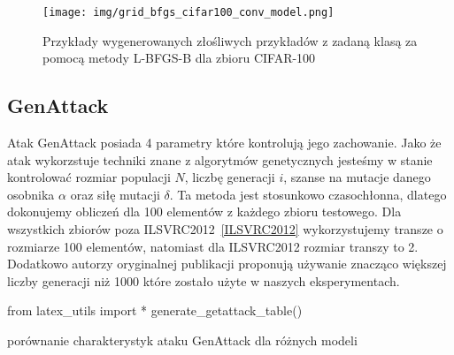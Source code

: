 \documentclass[
    left=2.5cm,         %
    right=2.5cm,        %
    top=2.5cm,          %
    bottom=3cm,         %
    bindingoffset=6mm,  %
    nohyphenation=false %
]{eiti/eiti-thesis}
\begin{document}
\begin{figure}[H]
    \texttt{[image: img/grid\_bfgs\_cifar100\_conv\_model.png]}
    \caption{Przykłady wygenerowanych złośliwych przykładów z zadaną klasą za pomocą metody L-BFGS-B dla zbioru CIFAR-100}
    \label{fig:cifar100_grid_bfgs}
\end{figure}


\subsection{GenAttack}
Atak GenAttack posiada 4 parametry które kontrolują jego zachowanie. Jako że atak wykorzstuje techniki
znane z algorytmów genetycznych jesteśmy w stanie kontrolować rozmiar populacji $N$, liczbę generacji $i$, szanse na mutacje
danego osobnika $\alpha$ oraz siłę mutacji $\delta$.
Ta metoda jest stosunkowo czasochłonna, dlatego dokonujemy obliczeń dla 100 elementów z każdego zbioru testowego.
Dla wszystkich zbiorów poza ILSVRC2012~\ref{ILSVRC2012} wykorzystujemy transze o rozmiarze 100 elementów, natomiast dla ILSVRC2012 rozmiar transzy to 2.
Dodatkowo autorzy oryginalnej publikacji proponują używanie znacząco większej liczby generacji niż 1000 które zostało użyte w naszych eksperymentach.

\begin{table}[h]
\begin{adjustbox}{max width=\textwidth}
\begin{pycode}
from latex_utils import *
generate_getattack_table()
\end{pycode}
\end{adjustbox}
\caption{porównanie charakterystyk ataku GenAttack dla różnych modeli}
\end{table}
\end{document}
